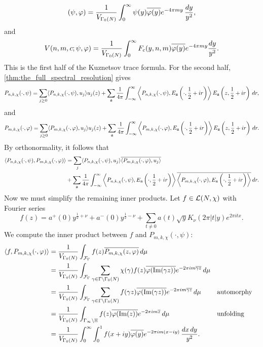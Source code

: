     \[
      (\psi,\varphi) = \frac{1}{V_{\Gamma_{0}(N)}}\int_{0}^{\infty}\psi(y)\overline{\varphi(y)}e^{-4\pi my}\,\frac{dy}{y^{2}},
    \]
    and
    \[
      V(n,m,c;\psi,\varphi) = \frac{1}{V_{\Gamma_{0}(N)}}\int_{0}^{\infty}F_{c}(y,n,m)\overline{\varphi(y)}e^{-4\pi my}\frac{dy}{y^{2}}.
    \]
    This is the first half of the Kuznetsov trace formula. For the second half, \cref{thm:the_full_spectral_resolution} gives
    \[
      P_{n,k,\chi}(\cdot,\psi) = \sum_{j \ge 0}\langle P_{n,k,\chi}(\cdot,\psi),u_{j}\rangle u_{j}(z)+\sum_{\mathfrak{a}}\frac{1}{4\pi}\int_{-\infty}^{\infty}\left\langle P_{n,k,\chi}(\cdot,\psi),E_{\mathfrak{a}}\left(\cdot,\frac{1}{2}+ir\right)\right\rangle E_{\mathfrak{a}}\left(z,\frac{1}{2}+ir\right)\,dr,
    \]
    and
    \[
      P_{m,k,\chi}(\cdot,\varphi) = \sum_{j \ge 0}\langle P_{m,k,\chi}(\cdot,\varphi),u_{j}\rangle u_{j}(z)+\sum_{\mathfrak{a}}\frac{1}{4\pi}\int_{-\infty}^{\infty}\left\langle P_{m,k,\chi}(\cdot,\varphi),E_{\mathfrak{a}}\left(\cdot,\frac{1}{2}+ir\right)\right\rangle E_{\mathfrak{a}}\left(z,\frac{1}{2}+ir\right)\,dr.
    \]
    By orthonormality, it follows that
    \begin{align*}
      \langle P_{n,k,\chi}(\cdot,\psi),P_{m,k,\chi}(\cdot,\varphi)\rangle &= \sum_{j}\langle P_{n,k,\chi}(\cdot,\psi),u_{j}\rangle\overline{\langle P_{m,k,\chi}(\cdot,\varphi),u_{j}\rangle} \\
      &+\sum_{\mathfrak{a}}\frac{1}{4\pi}\int_{-\infty}^{\infty}\left\langle P_{n,k,\chi}(\cdot,\psi),E_{\mathfrak{a}}\left(\cdot,\frac{1}{2}+ir\right)\right\rangle\overline{\left\langle P_{m,k,\chi}(\cdot,\varphi),E_{\mathfrak{a}}\left(\cdot,\frac{1}{2}+ir\right)\right\rangle}\,dr.
    \end{align*}
    Now we must simplify the remaining inner products. Let $f \in \mathcal{L}(N,\chi)$ with Fourier series
    \[
      f(z) = a^{+}(0)y^{\frac{1}{2}+\nu}+a^{-}(0)y^{\frac{1}{2}-\nu}+\sum_{t \neq 0}a(t)\sqrt{y}K_{\nu}(2\pi|t|y)e^{2\pi itx}.
    \]
    We compute the inner product between $f$ and $P_{m,k,\chi}(\cdot,\psi)$:
    \begin{align*}
      \langle f,P_{m,k,\chi}(\cdot,\varphi)\rangle &= \frac{1}{V_{\Gamma_{0}(N)}}\int_{\mathcal{F}_{\Gamma}}f(z)\overline{P_{m,k,\chi}(z,\varphi)}\,d\mu \\
      &= \frac{1}{V_{\Gamma_{0}(N)}}\int_{\mathcal{F}_{\Gamma}}\sum_{\gamma \in \Gamma\backslash\Gamma_{0}(N)}\chi(\gamma)f(z)\overline{\varphi(\mathrm{Im}(\gamma z))}e^{-2\pi im\overline{\gamma z}}\,d\mu \\
      &= \frac{1}{V_{\Gamma_{0}(N)}}\int_{\mathcal{F}_{\Gamma}}\sum_{\gamma \in \Gamma\backslash\Gamma_{0}(N)}f(\gamma z)\overline{\varphi(\mathrm{Im}(\gamma z))}e^{-2\pi im\overline{\gamma z}}\,d\mu && \text{automorphy} \\
      &= \frac{1}{V_{\Gamma_{0}(N)}}\int_{\Gamma_{\infty}\backslash\mathbb{H}}f(z)\overline{\varphi(\mathrm{Im}(z))}e^{-2\pi im\overline{z}}\,d\mu && \text{unfolding} \\
      &= \frac{1}{V_{\Gamma_{0}(N)}}\int_{0}^{\infty}\int_{0}^{1}f(x+iy)\overline{\varphi(y)}e^{-2\pi im(x-iy)}\,\frac{dx\,dy}{y^{2}}.
    \end{align*}
